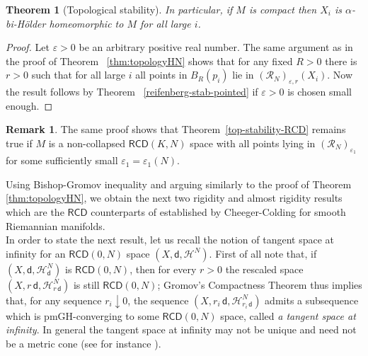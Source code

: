 \documentclass[a4paper]{amsart}
\theoremstyle{plain}
\newtheorem{theorem}[lemma]{Theorem}
\theoremstyle{definition}
\newtheorem{remark}[lemma]{Remark}
\numberwithin{equation}{section}
\newcommand{\RCD}{\mathsf{RCD}}
\newcommand{\sfd}{\mathsf d}
\newcommand{\cR}{\mathcal{R}}
\newcommand{\cH}{\mathcal{H}}
\newcommand{\eps}{\varepsilon}
\begin{document}
{\begin{theorem}[Topological stability]
In particular, if $M$ is compact then $X_i$ is $\alpha$-bi-H\"older homeomorphic to $M$ for all large $i$.
\end{theorem}
\begin{proof}
Let $\eps>0$ be an arbitrary  positive real number. The same argument as in the proof of Theorem ~\ref{thm:topologyHN} shows that for any fixed $R>0$ there is $r>0$ such that for all large $i$ all points in $B_R(p_i)$ lie in $ (\cR_{N})_{\varepsilon, r}(X_i)$. Now the result follows by Theorem ~\ref{reifenberg-stab-pointed} if $\eps>0$ is chosen small enough.
\end{proof}
\begin{remark}
The same proof shows that Theorem~\ref{top-stability-RCD} remains true if $M$ is a non-collapsed $\RCD(K,N)$ space with all points lying in $(\cR_{N})_{\eps_1}$  for some sufficiently small $\eps_1=\eps_1(N)$.
\end{remark}

Using Bishop-Gromov inequality and arguing similarly to the proof of Theorem \ref{thm:topologyHN}, we obtain the next two rigidity and almost rigidity results which are the $\RCD$ counterparts of \cite[Theorem A.1.10, A.1.11]{CC97} established by Cheeger-Colding for smooth Riemannian manifolds.
\\In order to state the next result, let us recall the notion of tangent space at infinity for an $\RCD(0,N)$ space $(X,\sfd, \cH^{N})$. First of all note that, if $(X,\sfd, \cH^{N}_{\sfd})$ is $\RCD(0,N)$, then for every $r>0$ the rescaled space  $(X,r \,\sfd, \cH^{N}_{r \, \sfd})$ is still $\RCD(0,N)$; Gromov's Compactness Theorem thus implies that, for any sequence $r_{i}\downarrow 0$, the sequence $(X,r_{i}\, \sfd, \cH^{N}_{r_{i}\, \sfd})$ admits a subsequence which is pmGH-converging to some $\RCD(0,N)$ space, called \emph{a tangent space at infinity}.  In  general the tangent space at infinity may not be unique and need not be a metric cone (see for instance \cite[Example 8.95]{CC97}).






}
\end{document}
